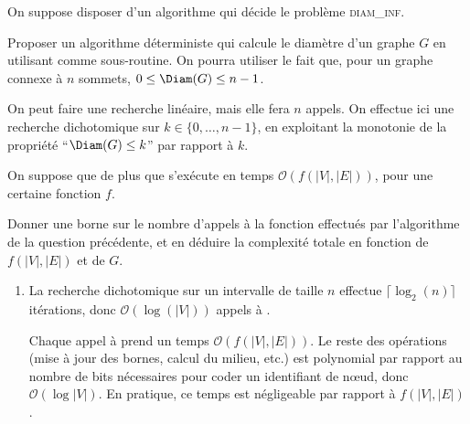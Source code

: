 \begin{exercice}
  On suppose disposer d'un algorithme \Decide qui décide le problème \textsc{diam\_inf}.
  
  \begin{questions}
  \item Proposer un algorithme déterministe \Diam qui calcule le diamètre d'un graphe $G$ en utilisant  \Decide comme sous-routine.
    On pourra utiliser le fait que, pour un graphe connexe à $n$ sommets, $0\le \Diam(G)\le n-1$.
  \end{questions}
  \begin{corrections}
    On peut faire une recherche linéaire, mais elle fera $n$ appels.
    On effectue ici une recherche dichotomique sur $k\in\{0,\dots,n-1\}$,
    en exploitant la monotonie de la propriété ``$\Diam(G)\le k$'' par rapport à $k$.

    \begin{algorithm}[H]
    \end{algorithm}
  \end{corrections}
  

  On suppose que de plus que \Decide s'exécute en temps $\mathcal{O}\left( f(|V|, |E|) \right)$, pour une certaine fonction $f$.
  \begin{questions}
  \item Donner une borne sur le nombre d'appels à la fonction \Decide effectués par l'algorithme \Diam de la question précédente,
    et en déduire la complexité totale en fonction de $f(|V|, |E|)$ et de $G$.
  \end{questions}
  \begin{corrections}
    \begin{enumerate}
    \item La recherche dichotomique sur un intervalle de taille $n$ effectue
      $\lceil\log_2(n)\rceil$ itérations, donc $\mathcal{O}(\log(|V|))$ appels à \Decide.

      Chaque appel à \Decide prend un temps $\mathcal{O}(f(|V|, |E|))$.
      Le reste des opérations (mise à jour des bornes, calcul du milieu, etc.)
      est polynomial par rapport au nombre de bits nécessaires pour coder un identifiant de n\oe ud,
      donc $\mathcal{O}(\log{|V|})$.
      En pratique, ce temps est négligeable par rapport à $f(|V|, |E|)$.


\end{enumerate}
\end{corrections}
\end{exercice}
